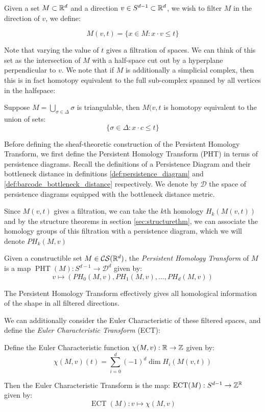 Given a set \(M \subset\mathbb{R}^d\) and a direction \(v\in S^{d-1}\subset \mathbb{R}^d\), we wish to filter \(M\) in the direction of \(v\), we define:

\[M(v,t) = \{x\in M: x\cdot v \leq t\}\]

Note that varying the value of \(t\) gives a filtration of spaces. We can think of this set as the intersection of \(M\) with a half-space cut out by a hyperplane perpendicular to \(v\). We note that if \(M\) is additionally a simplicial complex, then this is in fact homotopy equivalent to the full sub-complex spanned by all vertices in the halfspace:

\begin{proposition}
    Suppose \(M=\bigcup_{\sigma \in \Delta} \sigma\) is triangulable, then \(M(v,t\) is homotopy equivalent to the union of sets:
    \[\{\sigma\in\Delta: x\cdot c\leq t\}\]
\end{proposition}

Before defining the sheaf-theoretic construction of the Persistent Homology Transform, we first define the Persistent Homology Transform (PHT) in terms of persistence diagrams. Recall the definitions of a Persistence Diagram and their bottleneck distance in definitions \ref{def:persistence_diagram} and \ref{def:barcode_bottleneck_distance} respectively. We denote by \(\mathcal{D}\) the space of persistence diagrams equipped with the bottleneck distance metric. 

Since \(M(v,t)\) gives a filtration, we can take the \(k\)th homology \(H_k(M(v,t))\) and by the structure theorems in section \ref{sec:structurethm}, we can associate the homology groups of this filtration with a persistence diagram, which we will denote \(PH_k(M,v)\)


\begin{definition}
    Given a constructible set \(M\in \mathcal{CS}(\mathbb{R}^d)\), the \textit{Persistent Homology Transform} of \(M\) is a map \(\operatorname{PHT}(M):S^{d-1}\rightarrow \mathcal{D}^d\) given by:
    \[v\mapsto (PH_0(M,v),PH_1(M,v),\dots,PH_d(M,v))\]    
\end{definition}

The Persistent Homology Transform effectively gives all homological information of the shape in all filtered directions. 

We can additionally consider the Euler Characteristic of these filtered spaces, and define the \textit{Euler Characteristic Transform} (ECT):

\begin{definition}
    Define the Euler Characteristic function \(\chi(M,v):\mathbb{R}\rightarrow \mathbb{Z}\) given by:
    \[\chi(M,v)(t)= \sum_{i=0}^d(-1)^d\operatorname{dim}H_i(M(v,t))\]

    Then the Euler Characteristic Transform is the map: \(\operatorname{ECT}(M):S^{d-1}\rightarrow \mathbb{Z}^{\mathbb{R}}\) given by:
    \[\operatorname{ECT}(M):v\mapsto\chi(M,v)\]
\end{definition}

